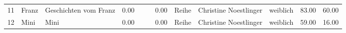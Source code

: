 \begin{table}
\begin{center}
{\begin{tabular}{rllrllrlllrr}
  11 & Franz                                                                                                                                                                                                                                                           & Geschichten vom Franz                                                                                                                                                                                                                                           & 0.00 &                                                                                                                                                                                                                                                                 &                                                                                                                                                                                                                                                                 & 0.00 & Reihe & Christine Noestlinger                                                                                                                                                                                                                                           & weiblich & 83.00 & 60.00 \\ 
  12 & Mini                                                                                                                                                                                                                                                            & Mini                                                                                                                                                                                                                                                            & 0.00 &                                                                                                                                                                                                                                                                 &                                                                                                                                                                                                                                                                 & 0.00 & Reihe & Christine Noestlinger                                                                                                                                                                                                                                           & weiblich & 59.00 & 16.00 \\ 

\end{tabular}}
\end{center}
\end{table}
